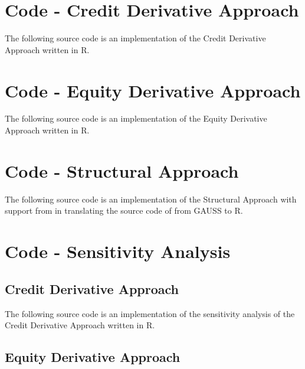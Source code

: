 \chapter{Code - Credit Derivative Approach} \label{creditderivativeapproach}

The following source code is an implementation of the Credit Derivative Approach \citep{de2011pricing} written in R.
 


\chapter{Code - Equity Derivative Approach} \label{equityderivativeapproach}

The following source code is an implementation of the Equity Derivative Approach \citep{de2011pricing} written in R.
 


\chapter{Code - Structural Approach} \label{structuralapproach}

The following source code is an implementation of the Structural Approach \citep{pennacchi2010structural} with support from \citet{codestructrural} in translating the source code of \citet{pennacchi2010structural} from GAUSS to R.
 


\chapter{Code - Sensitivity Analysis}

\section{Credit Derivative Approach} \label{sensicredit}

The following source code is an implementation of the sensitivity analysis of the Credit Derivative Approach \citep{de2011pricing} written in R.
 


\section{Equity Derivative Approach} \label{sensiequity}

